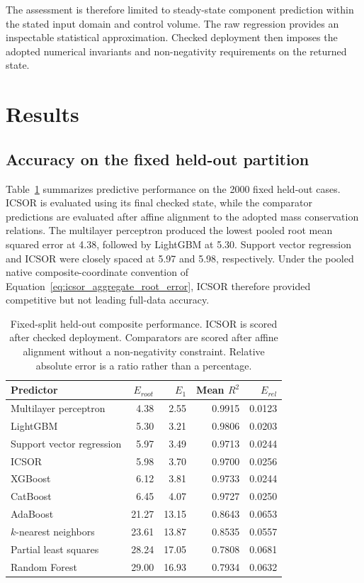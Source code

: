 The assessment is therefore limited to steady-state component prediction within the stated input domain and control volume. The raw regression provides an inspectable statistical approximation. Checked deployment then imposes the adopted numerical invariants and non-negativity requirements on the returned state.

\section{Results}
\label{sec:icsor_results}

\subsection{Accuracy on the fixed held-out partition}

Table~\ref{tab:icsor_fixed_results} summarizes predictive performance on the 2000 fixed held-out cases. ICSOR is evaluated using its final checked state, while the comparator predictions are evaluated after affine alignment to the adopted mass conservation relations. The multilayer perceptron produced the lowest pooled root mean squared error at 4.38, followed by LightGBM at 5.30. Support vector regression and ICSOR were closely spaced at 5.97 and 5.98, respectively. Under the pooled native composite-coordinate convention of Equation~\eqref{eq:icsor_aggregate_root_error}, ICSOR therefore provided competitive but not leading full-data accuracy.

\begin{table}[htbp]
\centering\small
\caption{Fixed-split held-out composite performance. ICSOR is scored after checked deployment. Comparators are scored after affine alignment without a non-negativity constraint. Relative absolute error is a ratio rather than a percentage.}
\label{tab:icsor_fixed_results}
\begin{tabular}{p{4.7cm}rrrr}
\toprule
Predictor & $E_{root}$ & $E_1$ & Mean $R^2$ & $E_{rel}$\\
\midrule
Multilayer perceptron & 4.38 & 2.55 & 0.9915 & 0.0123\\
LightGBM & 5.30 & 3.21 & 0.9806 & 0.0203\\
Support vector regression & 5.97 & 3.49 & 0.9713 & 0.0244\\
ICSOR & 5.98 & 3.70 & 0.9700 & 0.0256\\
XGBoost & 6.12 & 3.81 & 0.9733 & 0.0244\\
CatBoost & 6.45 & 4.07 & 0.9727 & 0.0250\\
AdaBoost & 21.27 & 13.15 & 0.8643 & 0.0653\\
$k$-nearest neighbors & 23.61 & 13.87 & 0.8535 & 0.0557\\
Partial least squares & 28.24 & 17.05 & 0.7808 & 0.0681\\
Random Forest & 29.00 & 16.93 & 0.7934 & 0.0632\\
\bottomrule
\end{tabular}
\end{table}

